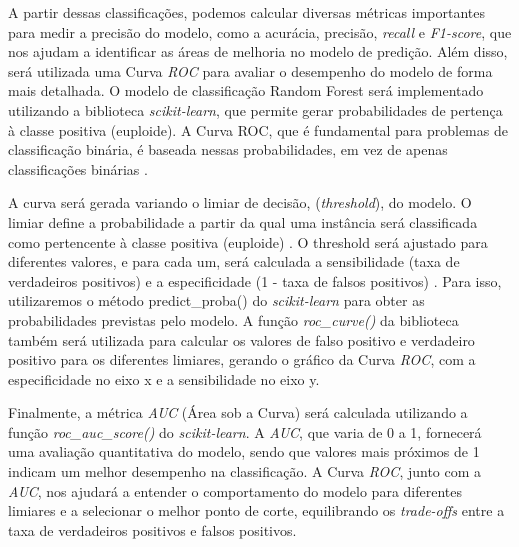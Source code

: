 A partir dessas classificações, podemos calcular diversas métricas importantes para medir a precisão do modelo, como a acurácia, precisão, \textit{recall} e \textit{F1-score}, que nos ajudam a identificar as áreas de melhoria no modelo de predição. Além disso, será utilizada uma Curva \textit{ROC} para avaliar o desempenho do modelo de forma mais detalhada. O modelo de classificação Random Forest será implementado utilizando a biblioteca \textit{scikit-learn}, que permite gerar probabilidades de pertença à classe positiva (euploide). A Curva ROC, que é fundamental para problemas de classificação binária, é baseada nessas probabilidades, em vez de apenas classificações binárias \cite{vilela2022}. 

A curva será gerada variando o limiar de decisão, (\textit{threshold}), do modelo. O limiar define a probabilidade a partir da qual uma instância será classificada como pertencente à classe positiva (euploide) \cite{vilela2022}. O threshold será ajustado para diferentes valores, e para cada um, será calculada a sensibilidade (taxa de verdadeiros positivos) e a especificidade (1 - taxa de falsos positivos) \cite{vilela2022}. Para isso, utilizaremos o método predict\_proba() do \textit{scikit-learn} para obter as probabilidades previstas pelo modelo. A função \textit{roc\_curve()} da biblioteca também será utilizada para calcular os valores de falso positivo e verdadeiro positivo para os diferentes limiares, gerando o gráfico da Curva \textit{ROC}, com a especificidade no eixo x e a sensibilidade no eixo y. 

Finalmente, a métrica \textit{AUC} (Área sob a Curva) será calculada utilizando a função \textit{roc\_auc\_score()} do \textit{scikit-learn}. A \textit{AUC}, que varia de 0 a 1, fornecerá uma avaliação quantitativa do modelo, sendo que valores mais próximos de 1 indicam um melhor desempenho na classificação. A Curva \textit{ROC}, junto com a \textit{AUC}, nos ajudará a entender o comportamento do modelo para diferentes limiares e a selecionar o melhor ponto de corte, equilibrando os \textit{trade-offs} entre a taxa de verdadeiros positivos e falsos positivos.

